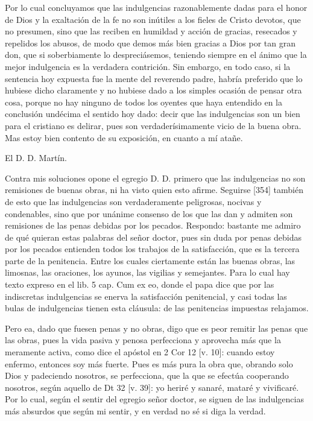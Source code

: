 Por lo cual concluyamos que las indulgencias razonablemente dadas para el honor de Dios y la exaltación de la fe no son inútiles a los fieles de Cristo devotos, que no presumen, sino que las reciben en humildad y acción de gracias, resecados y repelidos los abusos, de modo que demos más bien gracias a Dios por tan gran don, que si soberbiamente lo despreciásemos, teniendo siempre en el ánimo que la mejor indulgencia es la verdadera contrición. Sin embargo, en todo caso, si la sentencia hoy expuesta fue la mente del reverendo padre, habría preferido que lo hubiese dicho claramente y no hubiese dado a los simples ocasión de pensar otra cosa, porque no hay ninguno de todos los oyentes que haya entendido en la conclusión undécima el sentido hoy dado: decir que las indulgencias son un bien para el cristiano es delirar, pues son verdaderísimamente vicio de la buena obra. Mas estoy bien contento de su exposición, en cuanto a mí atañe.

El D. D. Martín.

Contra mis soluciones opone el egregio D. D. primero que las indulgencias no son remisiones de buenas obras, ni ha visto quien esto afirme. Seguirse [354] también de esto que las indulgencias son verdaderamente peligrosas, nocivas y condenables, sino que por unánime consenso de los que las dan y admiten son remisiones de las penas debidas por los pecados. Respondo: bastante me admiro de qué quieran estas palabras del señor doctor, pues sin duda por penas debidas por los pecados entienden todos los trabajos de la satisfacción, que es la tercera parte de la penitencia. Entre los cuales ciertamente están las buenas obras, las limosnas, las oraciones, los ayunos, las vigilias y semejantes. Para lo cual hay texto expreso en el lib. 5 cap. Cum ex eo, donde el papa dice que por las indiscretas indulgencias se enerva la satisfacción penitencial, y casi todas las bulas de indulgencias tienen esta cláusula: de las penitencias impuestas relajamos.

Pero ea, dado que fuesen penas y no obras, digo que es peor remitir las penas que las obras, pues la vida pasiva y penosa perfecciona y aprovecha más que la meramente activa, como dice el apóstol en 2 Cor 12 [v. 10]: cuando estoy enfermo, entonces soy más fuerte. Pues es más pura la obra que, obrando solo Dios y padeciendo nosotros, se perfecciona, que la que se efectúa cooperando nosotros, según aquello de Dt 32 [v. 39]: yo heriré y sanaré, mataré y vivificaré. Por lo cual, según el sentir del egregio señor doctor, se siguen de las indulgencias más absurdos que según mi sentir, y en verdad no sé si diga la verdad.


